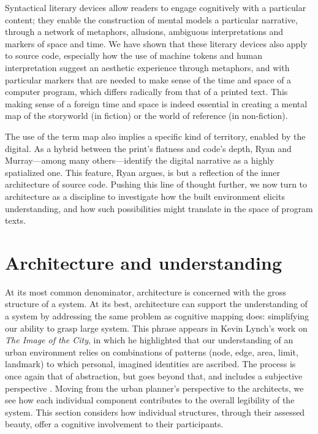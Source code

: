 \spacersmall

Syntactical literary devices allow readers to engage cognitively with a particular content; they enable the construction of mental models a particular narrative, through a network of metaphors, allusions, ambiguous interpretations and markers of space and time. We have shown that these literary devices also apply to source code, especially how the use of machine tokens and human interpretation suggest an aesthetic experience through metaphors, and with particular markers that are needed to make sense of the time and space of a computer program, which differs radically from that of a printed text. This making sense of a foreign time and space is indeed essential in creating a mental map of the storyworld (in fiction) or the world of reference (in non-fiction).

The use of the term map also implies a specific kind of territory, enabled by the digital. As a hybrid between the print's flatness and code's depth, Ryan and Murray—among many others—identify the digital narrative as a highly spatialized one. This feature, Ryan argues, is but a reflection of the inner architecture of source code. Pushing this line of thought further, we now turn to architecture as a discipline to investigate how the built environment elicits understanding, and how such possibilities might translate in the space of program texts.

\section{Architecture and understanding}
\label{sec:arch-understanding}

At its most common denominator, architecture is concerned with the gross structure of a system. At its best, architecture can support the understanding of a system by addressing the same problem as cognitive mapping does: simplifying our ability to grasp large system. This phrase appears in Kevin Lynch's work on \emph{The Image of the City}, in which he highlighted that our understanding of an urban environment relies on combinations of patterns (node, edge, area, limit, landmark) to which personal, imagined identities are ascribed. The process is once again that of abstraction, but goes beyond that, and includes a subjective perspective \citep{lynch_image_1959}. Moving from the urban planner's perspective to the architects, we see how each individual component contributes to the overall legibility of the system. This section considers how individual structures, through their assessed beauty, offer a cognitive involvement to their participants.

